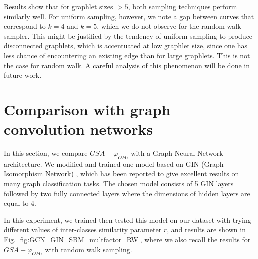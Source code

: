 Results show that for graphlet sizes $>5$, both sampling techniques perform similarly well. For uniform sampling, however, we note a gap between curves that correspond to $k=4$ and $k=5$, which we do not observe for the random walk sampler. This might be justified by the tendency of uniform sampling to produce disconnected graphlets, which is accentuated at low graphlet size, since one has less chance of encountering an existing edge than for large graphlets. This is not the case for random walk. A careful analysis of this phenomenon will be done in future work.

\section{Comparison with graph convolution networks}
In this section, we compare $GSA-\varphi_{OPU}$ with a Graph Neural Network architecture. We modified and trained one model based on GIN (Graph Isomorphism Network) \citep{GCN_powerful}, which has been reported to give excellent results on many graph classification tasks.
The chosen model consists of 5 GIN layers followed by two fully connected layers where the dimensions of hidden layers are equal to 4. 

In this experiment, we trained then tested this model on our dataset with trying different values of inter-classes similarity parameter $r$, and results are shown in Fig. \ref{fig:GCN_GIN_SBM_multfactor_RW}, where we also recall the results for $GSA-\varphi_{OPU}$ with random walk sampling.

